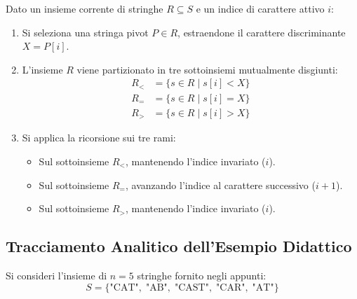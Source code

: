Dato un insieme corrente di stringhe $R \subseteq S$ e un indice di carattere attivo $i$:
\begin{enumerate}
  \item Si seleziona una stringa pivot $P \in R$, estraendone il carattere discriminante $X = P[i]$.
  \item L'insieme $R$ viene partizionato in tre sottoinsiemi mutualmente disgiunti:
  \begin{align}
    R_{<} &= \{ s \in R \mid s[i] < X \} \\
    R_{=} &= \{ s \in R \mid s[i] = X \} \\
    R_{>} &= \{ s \in R \mid s[i] > X \}
  \end{align}
  \item Si applica la ricorsione sui tre rami:
  \begin{itemize}
    \item Sul sottoinsieme $R_{<}$, mantenendo l'indice invariato ($i$).
    \item Sul sottoinsieme $R_{=}$, avanzando l'indice al carattere successivo ($i + 1$).
    \item Sul sottoinsieme $R_{>}$, mantenendo l'indice invariato ($i$).
  \end{itemize}
\end{enumerate}

\FloatBarrier
\subsection{Tracciamento Analitico dell'Esempio Didattico}
\label{subsec:tracciamento-esempio-tst}

Si consideri l'insieme di $n = 5$ stringhe fornito negli appunti:
\begin{equation}
  S = \{\text{"CAT"}, \; \text{"AB"}, \; \text{"CAST"}, \; \text{"CAR"}, \; \text{"AT"}\}
\end{equation}

